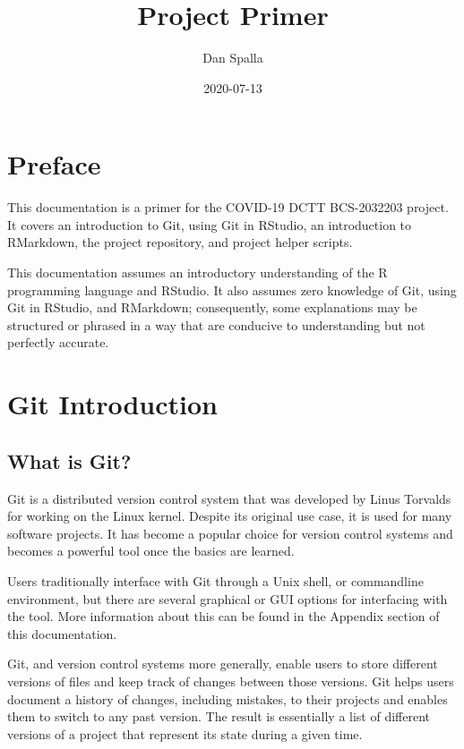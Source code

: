 \documentclass[
]{book}
\title{Project Primer}
\author{Dan Spalla}
\date{2020-07-13}
\begin{document}
\maketitle

{
\setcounter{tocdepth}{1}
\tableofcontents
}
\hypertarget{preface}{%
\chapter*{Preface}\label{preface}}

This documentation is a primer for the COVID-19 DCTT BCS-2032203 project. It covers an introduction to Git, using Git in RStudio, an introduction to RMarkdown, the project repository, and project helper scripts.

This documentation assumes an introductory understanding of the R programming language and RStudio. It also assumes zero knowledge of Git, using Git in RStudio, and RMarkdown; consequently, some explanations may be structured or phrased in a way that are conducive to understanding but not perfectly accurate.

\hypertarget{git-introduction}{%
\chapter{Git Introduction}\label{git-introduction}}

\hypertarget{what-is-git}{%
\section{What is Git?}\label{what-is-git}}

Git is a distributed version control system that was developed by Linus Torvalds for working on the Linux kernel. Despite its original use case, it is used for many software projects. It has become a popular choice for version control systems and becomes a powerful tool once the basics are learned.

Users traditionally interface with Git through a Unix shell, or commandline environment, but there are several graphical or GUI options for interfacing with the tool. More information about this can be found in the Appendix section of this documentation.

Git, and version control systems more generally, enable users to store different versions of files and keep track of changes between those versions. Git helps users document a history of changes, including mistakes, to their projects and enables them to switch to any past version. The result is essentially a list of different versions of a project that represent its state during a given time.
\end{document}
